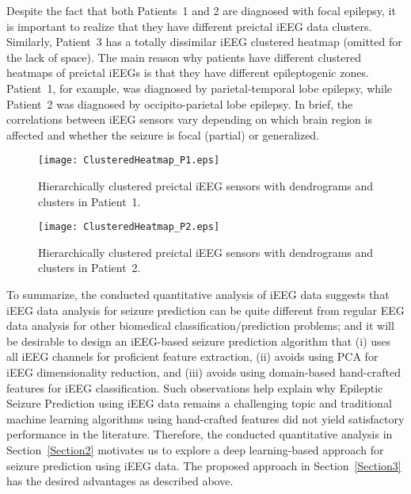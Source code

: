 \documentclass[journal]{IEEEtran}
\begin{document}
Despite the fact that both Patients~1 and 2 are diagnosed with focal epilepsy, it is important to realize that they have different preictal iEEG data clusters. Similarly, Patient~3 has a totally dissimilar iEEG clustered heatmap (omitted for the lack of space). The main reason why patients have different clustered heatmaps of preictal iEEGs is that they have different epileptogenic zones. Patient~1, for example, was diagnosed by parietal-temporal lobe epilepsy, while Patient~2 was diagnosed by occipito-parietal lobe epilepsy. In brief, the correlations between iEEG sensors vary depending on which brain region is affected and whether the seizure is focal (partial) or generalized.



\begin{figure}[!t]\centering
	\texttt{[image: ClusteredHeatmap\_P1.eps]}
	\caption{Hierarchically clustered preictal iEEG sensors with dendrograms and clusters in Patient~1.}
	\label{Fig_ClusteredHeatmap_Preictal_P1}
\end{figure}

\begin{figure}[!t]\centering
	\texttt{[image: ClusteredHeatmap\_P2.eps]}
	\caption{Hierarchically clustered preictal iEEG sensors with dendrograms and clusters in Patient~2.}
	\label{Fig_ClusteredHeatmap_Preictal_P2}
\end{figure} 





To summarize, the conducted quantitative analysis of iEEG data suggests that iEEG data analysis for seizure prediction can be quite different from regular EEG data analysis for other biomedical classification/prediction problems; and it will be desirable to design an iEEG-based seizure prediction algorithm that (i) uses all iEEG channels for proficient feature extraction, (ii) avoids using PCA for iEEG dimensionality reduction, and (iii) avoids using domain-based hand-crafted features for iEEG classification. Such observations help explain why Epileptic Seizure Prediction using iEEG data remains a challenging topic and traditional machine learning algorithms using hand-crafted features did not yield satisfactory performance in the literature. 
Therefore, the conducted quantitative analysis in Section~\ref{Section2} motivates us to explore a deep learning-based approach for seizure prediction using iEEG data. The proposed approach in Section~\ref{Section3} has the desired advantages as described above. 
\end{document}
